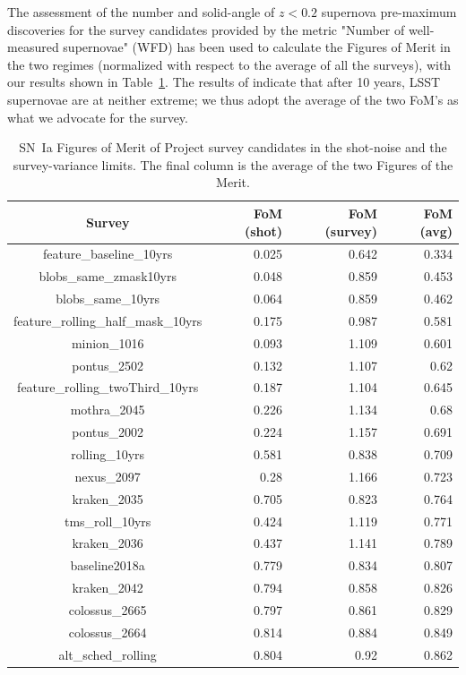 \documentclass[a4paper,10pt]{article}
\begin{document}
The assessment of the number and solid-angle of $z<0.2$ supernova pre-maximum discoveries 
for the survey candidates provided by the metric "Number of well-measured supernovae" (WFD)  has been used to calculate the Figures of Merit in the two regimes 
(normalized with respect to the average of all the surveys),
with our results shown in 
Table~\ref{table:ref}.  The results of \cite{howlett}  indicate that after 10 years,
LSST supernovae are at neither extreme; we thus adopt the average of the two FoM's as what we advocate for the survey.


\begin{table}
\caption{SN~Ia Figures of Merit of Project survey candidates
in  the shot-noise and the survey-variance limits.  The final column is the average
of the two Figures of the Merit.\label{table:ref}}
\centering
\begin{tabular}{crrr}
  \hline
  \hline
Survey & FoM (shot) & FoM (survey) & FoM (avg)\\
\hline
\hline
feature\_baseline\_10yrs & 0.025 & 0.642 & 0.334  \\
blobs\_same\_zmask10yrs & 0.048 & 0.859 & 0.453  \\
blobs\_same\_10yrs & 0.064 & 0.859 & 0.462  \\
feature\_rolling\_half\_mask\_10yrs & 0.175 & 0.987 & 0.581  \\
minion\_1016 & 0.093 & 1.109 & 0.601  \\
pontus\_2502 & 0.132 & 1.107 & 0.62  \\
feature\_rolling\_twoThird\_10yrs & 0.187 & 1.104 & 0.645  \\
mothra\_2045 & 0.226 & 1.134 & 0.68  \\
pontus\_2002 & 0.224 & 1.157 & 0.691  \\
rolling\_10yrs & 0.581 & 0.838 & 0.709  \\
nexus\_2097 & 0.28 & 1.166 & 0.723  \\
kraken\_2035 & 0.705 & 0.823 & 0.764  \\
tms\_roll\_10yrs & 0.424 & 1.119 & 0.771  \\
kraken\_2036 & 0.437 & 1.141 & 0.789  \\
baseline2018a & 0.779 & 0.834 & 0.807  \\
kraken\_2042 & 0.794 & 0.858 & 0.826  \\
colossus\_2665 & 0.797 & 0.861 & 0.829  \\
colossus\_2664 & 0.814 & 0.884 & 0.849  \\
alt\_sched\_rolling & 0.804 & 0.92 & 0.862  \\

\end{tabular}
\end{table}
\end{document}
